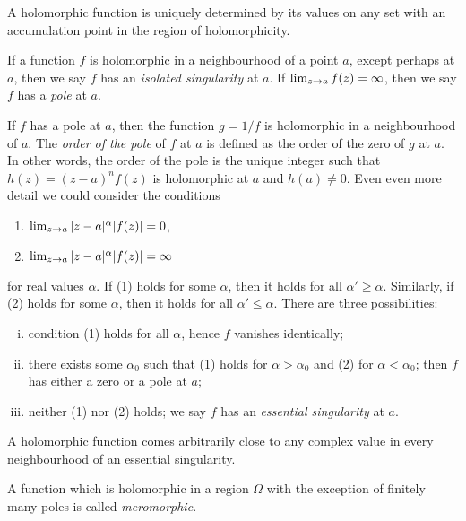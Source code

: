 \begin{corollary}
  A holomorphic function is uniquely determined by its values on any set with an accumulation point in the region of holomorphicity.
\end{corollary}

\begin{definition}
  If a function $f$ is holomorphic in a neighbourhood of a point $a$, except perhaps at $a$, then we say $f$ has an \emph{isolated singularity} at $a$. If $\lim_{z \rightarrow a} f(z) = \infty$, then we say $f$ has a \emph{pole} at $a$.
\end{definition}

If $f$ has a pole at $a$, then the function $g = 1/f$ is holomorphic in a neighbourhood of $a$. The \emph{order of the pole} of $f$ at $a$ is defined as the order of the zero of $g$ at $a$. In other words, the order of the pole is the unique integer such that $h(z) = (z-a)^n f(z)$ is holomorphic at $a$ and $h(a) \neq 0$. Even even more detail we could consider the conditions
\begin{enumerate}[(1)]
\item $\lim_{z \rightarrow a} |z-a|^\alpha |f(z)| = 0$,
\item $\lim_{z \rightarrow a} |z-a|^\alpha |f(z)| = \infty$
\end{enumerate}
for real values $\alpha$. If (1) holds for some $\alpha$, then it holds for all $\alpha' \geq \alpha$. Similarly, if (2) holds for some $\alpha$, then it holds for all $\alpha' \leq \alpha$. There are three possibilities:
\begin{enumerate}[(i)]
\item condition (1) holds for all $\alpha$, hence $f$ vanishes identically;
\item there exists some $\alpha_0$ such that (1) holds for $\alpha > \alpha_0$ and (2) for $\alpha < \alpha_0$; then $f$ has either a zero or a pole at $a$;
\item neither (1) nor (2) holds; we say $f$ has an \emph{essential singularity} at $a$.
\end{enumerate}

\begin{theorem}
  A holomorphic function comes arbitrarily close to any complex value in every neighbourhood of an essential singularity.
\end{theorem}

\begin{definition}
  A function which is holomorphic in a region $\Omega$ with the exception of finitely many poles is called \emph{meromorphic}.
\end{definition}

